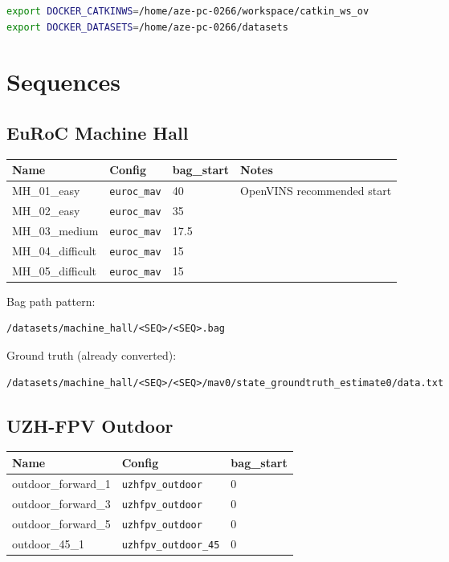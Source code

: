 \documentclass[11pt,a4paper]{article}
\begin{document}
\begin{lstlisting}[language=bash]
export DOCKER_CATKINWS=/home/aze-pc-0266/workspace/catkin_ws_ov
export DOCKER_DATASETS=/home/aze-pc-0266/datasets
\end{lstlisting}

\section{Sequences}

\subsection{EuRoC Machine Hall}
\begin{center}
\begin{tabular}{@{}llll@{}}
\toprule
\textbf{Name} & \textbf{Config} & \textbf{bag\_start} & \textbf{Notes} \\
\midrule
MH\_01\_easy & \texttt{euroc\_mav} & 40 & OpenVINS recommended start \\
MH\_02\_easy & \texttt{euroc\_mav} & 35 & \\
MH\_03\_medium & \texttt{euroc\_mav} & 17.5 & \\
MH\_04\_difficult & \texttt{euroc\_mav} & 15 & \\
MH\_05\_difficult & \texttt{euroc\_mav} & 15 & \\
\bottomrule
\end{tabular}
\end{center}

Bag path pattern:
\begin{lstlisting}
/datasets/machine_hall/<SEQ>/<SEQ>.bag
\end{lstlisting}
Ground truth (already converted):
\begin{lstlisting}
/datasets/machine_hall/<SEQ>/<SEQ>/mav0/state_groundtruth_estimate0/data.txt
\end{lstlisting}

\subsection{UZH-FPV Outdoor}
\begin{center}
\begin{tabular}{@{}lll@{}}
\toprule
\textbf{Name} & \textbf{Config} & \textbf{bag\_start} \\
\midrule
outdoor\_forward\_1 & \texttt{uzhfpv\_outdoor} & 0 \\
outdoor\_forward\_3 & \texttt{uzhfpv\_outdoor} & 0 \\
outdoor\_forward\_5 & \texttt{uzhfpv\_outdoor} & 0 \\
outdoor\_45\_1 & \texttt{uzhfpv\_outdoor\_45} & 0 \\
\bottomrule
\end{tabular}
\end{center}
\end{document}
